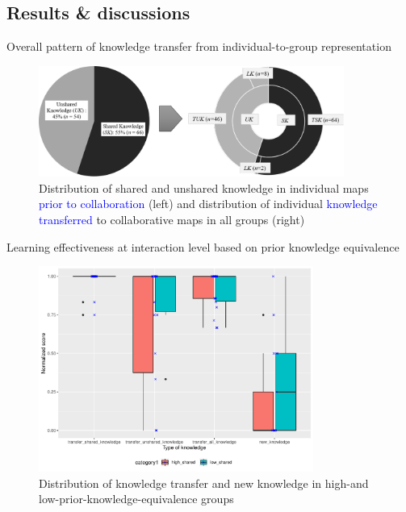 \subsection{Results \& discussions}
\begin{frame}{Overall pattern of knowledge transfer from individual-to-group representation}
    \begin{figure}[tb]
     \begin{center}
      \includegraphics[width=100mm]{images/rqb_dist-knowledge.pdf}
      \end{center}
      \caption{Distribution  of  shared  and  unshared  knowledge  in  individual maps \textcolor{blue}{prior to collaboration} (left) and distribution of individual \textcolor{blue}{knowledge transferred} to collaborative maps in all groups (right)}
      \label{rqb::result_dist}  
    \end{figure}
\end{frame}
\begin{frame}{Learning effectiveness at interaction level based on prior knowledge equivalence}
    \begin{figure}[tb]
     \begin{center}
      \includegraphics[width=90mm]{images/rqb_dist-shared-all-redraw.pdf}
      \end{center}
      \caption{Distribution of knowledge transfer and new knowledge in high-and  low-prior-knowledge-equivalence  groups}
      \label{rqb::dist_equival}  
    \end{figure}

\end{frame}
    
